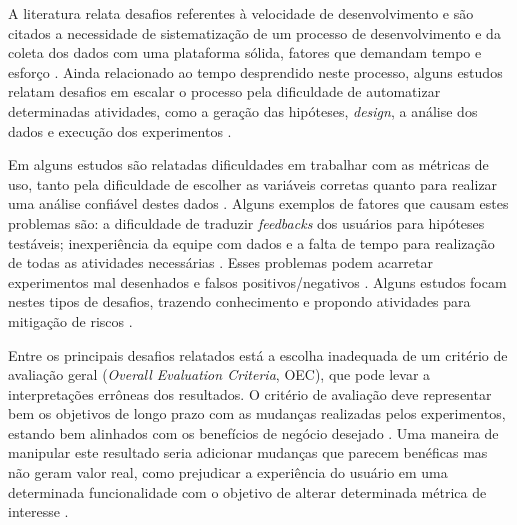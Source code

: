 A literatura relata desafios referentes à velocidade de desenvolvimento e são citados a necessidade de sistematização de um processo de desenvolvimento e da coleta dos dados com uma plataforma sólida, fatores que demandam tempo e esforço \cite{erthal_characterization_2023} \cite{fabijan_evolution_2017} \cite{fernandes_hitting_2015} \cite{fagerholm_right_2017} \cite{kohavi_online_2013} \cite{bures_infrastructure_2021}  \cite{fabijan_online_2020} \cite{le_goues_towards_2014}. Ainda relacionado ao tempo desprendido neste processo, alguns estudos relatam desafios em escalar o processo pela dificuldade de automatizar determinadas atividades, como a geração das hipóteses, \textit{design}, a análise dos dados e execução dos experimentos \cite{sauvola_towards_2015} \cite{quin_b_2024} \cite{kevic_characterizing_2017} \cite{liu_enterprise-level_2019} \cite{chen_automatic_2018}.

Em alguns estudos são relatadas dificuldades em trabalhar com as métricas de uso, tanto pela dificuldade de escolher as variáveis corretas quanto para realizar uma análise confiável destes dados \cite{quin_b_2024} \cite{fabijan_evolution_2017} \cite{fernandes_hitting_2015} \cite{fabijan_three_2019} \cite{kuhrmann_activity_2018} \cite{olsson_towards_2015} \cite{kevic_characterizing_2017} \cite{crook_seven_2009} \cite{kohavi_online_2013}. Alguns exemplos de fatores que causam estes problemas são: a dificuldade de traduzir \textit{feedbacks} dos usuários para hipóteses testáveis; inexperiência da equipe com dados e a falta de tempo para realização de todas as atividades necessárias \cite{le_goues_towards_2014} \cite{fabijan_benefits_2017} \cite{erthal_characterization_2023} \cite{issa_mattos_hurrier_2023}. Esses problemas podem acarretar experimentos mal desenhados e falsos positivos/negativos \cite{yu_new_2020} \cite{liu_enterprise-level_2019} \cite{larsen_statistical_2024}. Alguns estudos focam nestes tipos de desafios, trazendo conhecimento e propondo atividades para mitigação de riscos \cite{crook_seven_2009} \cite{larsen_statistical_2024}.

Entre os principais desafios relatados está a escolha inadequada de um critério de avaliação geral (\textit{Overall Evaluation Criteria}, OEC), que pode levar a interpretações errôneas dos resultados. O critério de avaliação deve representar bem os objetivos de longo prazo com as mudanças realizadas pelos experimentos, estando bem alinhados com os benefícios de negócio desejado \cite{crook_seven_2009}. Uma maneira de manipular este resultado seria adicionar mudanças que parecem benéficas mas não geram valor real, como prejudicar a experiência do usuário em uma determinada funcionalidade com o objetivo de alterar determinada métrica de interesse \cite{larsen_statistical_2024}.

